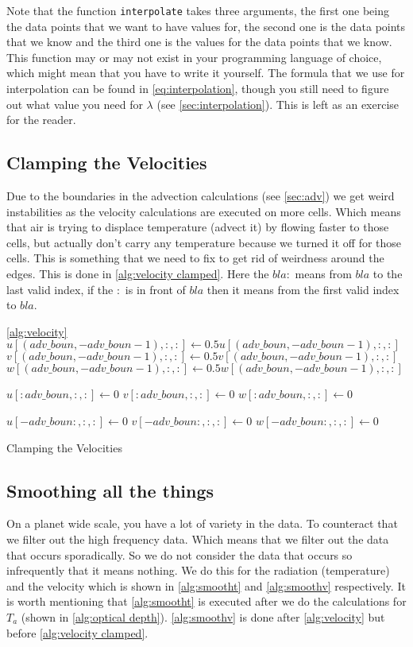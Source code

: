Note that the function \texttt{interpolate} takes three arguments, the first one being the data points that we want to have values for, the second one is the data points that we know and the 
third one is the values for the data points that we know. This function may or may not exist in your programming language of choice, which might mean that you have to write it yourself. 
The formula that we use for interpolation can be found in \autoref{eq:interpolation}, though you still need to figure out what value you need for $\lambda$ (see \autoref{sec:interpolation}). 
This is left as an exercise for the reader.

\subsection{Clamping the Velocities}
Due to the boundaries in the advection calculations (see \autoref{sec:adv}) we get weird instabilities as the velocity calculations are executed on more cells. Which means that air is trying to 
displace temperature (advect it) by flowing faster to those cells, but actually don't carry any temperature because we turned it off for those cells. This is something that we need to fix to get 
rid of weirdness around the edges. This is done in \autoref{alg:velocity clamped}. Here the $bla:$ means from $bla$ to the last valid index, if the $:$ is in front of $bla$ then it means from 
the first valid index to $bla$.

\begin{algorithm}
    \autoref{alg:velocity}
    $u[(adv\_boun, -adv\_boun - 1), :, :] \leftarrow 0.5u[(adv\_boun, -adv\_boun - 1), :, :]$ \;
    $v[(adv\_boun, -adv\_boun - 1), :, :] \leftarrow 0.5v[(adv\_boun, -adv\_boun - 1), :, :]$ \;
    $w[(adv\_boun, -adv\_boun - 1), :, :] \leftarrow 0.5w[(adv\_boun, -adv\_boun - 1), :, :]$ \;

    $u[:adv\_boun, :, :] \leftarrow 0 $\;
    $v[:adv\_boun, :, :] \leftarrow 0 $\;
    $w[:adv\_boun, :, :] \leftarrow 0 $\;

    $u[-adv\_boun:, :, :] \leftarrow 0$ \;
    $v[-adv\_boun:, :, :] \leftarrow 0$ \;
    $w[-adv\_boun:, :, :] \leftarrow 0$ \;
    \caption{Clamping the Velocities}
    \label{alg:velocity clamped}
\end{algorithm}

\subsection{Smoothing all the things}
On a planet wide scale, you have a lot of variety in the data. To counteract that we filter out the high frequency data. Which means that we filter out the data that occurs sporadically. So we 
do not consider the data that occurs so infrequently that it means nothing. We do this for the radiation (temperature) and the velocity which is shown in \autoref{alg:smootht} and 
\autoref{alg:smoothv} respectively. It is worth mentioning that \autoref{alg:smootht} is executed after we do the calculations for $T_a$ (shown in \autoref{alg:optical depth}). 
\autoref{alg:smoothv} is done after \autoref{alg:velocity} but before \autoref{alg:velocity clamped}. 


